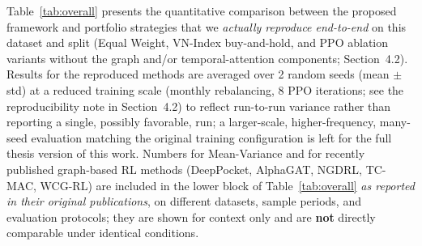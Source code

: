 \documentclass[runningheads]{llncs}
\begin{document}
Table~\ref{tab:overall} presents the quantitative comparison between the proposed framework and portfolio strategies that we \emph{actually reproduce end-to-end} on this dataset and split (Equal Weight, VN-Index buy-and-hold, and PPO ablation variants without the graph and/or temporal-attention components; Section~4.2). Results for the reproduced methods are averaged over 2 random seeds (mean $\pm$ std) at a reduced training scale (monthly rebalancing, 8 PPO iterations; see the reproducibility note in Section~4.2) to reflect run-to-run variance rather than reporting a single, possibly favorable, run; a larger-scale, higher-frequency, many-seed evaluation matching the original training configuration is left for the full thesis version of this work. Numbers for Mean-Variance and for recently published graph-based RL methods (DeepPocket, AlphaGAT, NGDRL, TC-MAC, WCG-RL) are included in the lower block of Table~\ref{tab:overall} \emph{as reported in their original publications}, on different datasets, sample periods, and evaluation protocols; they are shown for context only and are \textbf{not} directly comparable under identical conditions.
\end{document}
